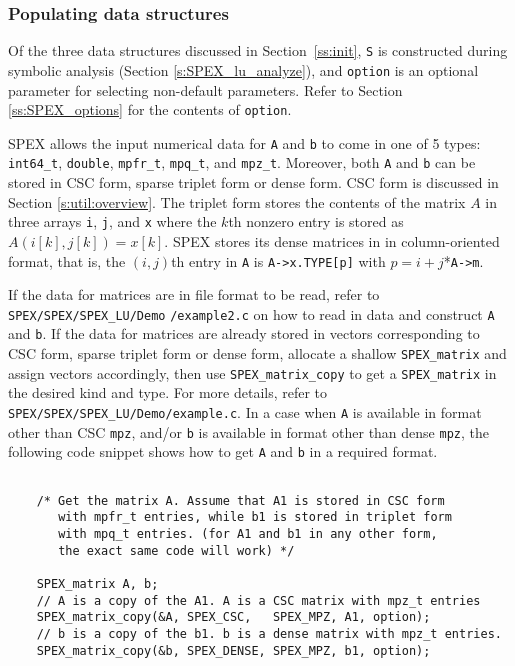 \documentclass[12pt]{report}
\theoremstyle{definition}
\begin{document}
\subsubsection{Populating data structures}
\label{ss:populate_Ab}

Of the three data structures discussed in Section~\ref{ss:init}, \verb|S| is
constructed during symbolic analysis (Section \ref{s:SPEX_lu_analyze}), and
\verb|option| is an optional parameter for selecting non-default parameters.
Refer to Section \ref{ss:SPEX_options} for the contents of \verb|option|.

SPEX allows the input numerical data for \verb|A| and \verb|b| to come in
one of 5 types: \verb|int64_t|, \verb|double|, \verb|mpfr_t|, \verb|mpq_t|,
and \verb|mpz_t|. Moreover, both \verb|A| and \verb|b| can be stored in
CSC form, sparse triplet form or dense form. CSC form is discussed in Section
\ref{s:util:overview}. The triplet form stores the contents of the matrix $A$
in three arrays \verb|i|, \verb|j|, and \verb|x| where the $k$th nonzero entry
is stored as $A ( i[k], j[k]) = x[k]$. SPEX stores its dense matrices in
in column-oriented format, that is, the $(i,j)$th entry in \verb|A|
is \verb|A->x.TYPE[p]| with $p = i+j$*\verb|A->m|.

If the data for matrices are in file format to be read, refer to
\newline \verb|SPEX/SPEX/SPEX_LU/Demo| \verb|/example2.c| on how to read in data and construct
\verb|A| and \verb|b|. If the data for matrices are already stored in vectors
corresponding to CSC form, sparse triplet form or dense form, allocate a
shallow \verb|SPEX_matrix| and assign vectors accordingly, then use
\verb|SPEX_matrix_copy| to get a \verb|SPEX_matrix| in the desired kind and
type. For more details, refer to \verb|SPEX/SPEX/SPEX_LU/Demo/example.c|. In a case when
\verb|A| is available in format other than CSC \verb|mpz|, and/or \verb|b| is
available in format other than dense \verb|mpz|, the following code snippet
shows how to get \verb|A| and \verb|b| in a required format.

{\small
\begin{verbatim}

    /* Get the matrix A. Assume that A1 is stored in CSC form
       with mpfr_t entries, while b1 is stored in triplet form
       with mpq_t entries. (for A1 and b1 in any other form,
       the exact same code will work) */

    SPEX_matrix A, b;
    // A is a copy of the A1. A is a CSC matrix with mpz_t entries
    SPEX_matrix_copy(&A, SPEX_CSC,   SPEX_MPZ, A1, option);
    // b is a copy of the b1. b is a dense matrix with mpz_t entries.
    SPEX_matrix_copy(&b, SPEX_DENSE, SPEX_MPZ, b1, option);
    \end{verbatim} }
\end{document}
